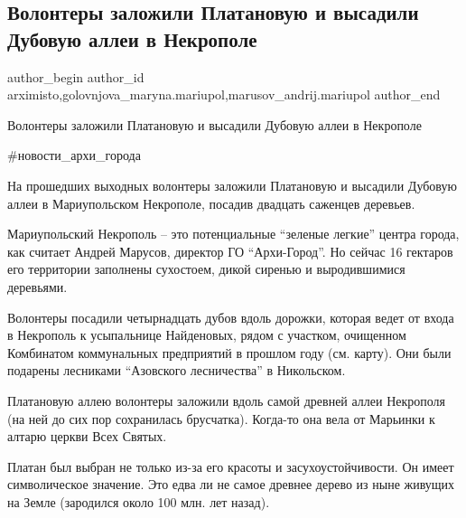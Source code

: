  
 
 
 
 

\subsection{Волонтеры заложили Платановую и высадили Дубовую аллеи в Некрополе}
\label{sec:26_04_2021.fb.arximisto.1.volontery_allei_platanovaja_dubovaja_nekropol}
 
\ifcmt
 author_begin
   author_id arximisto,golovnjova_maryna.mariupol,marusov_andrij.mariupol
 author_end
\fi

Волонтеры заложили Платановую и высадили Дубовую аллеи в Некрополе

\#новости\_архи\_города

На прошедших выходных волонтеры заложили Платановую и высадили Дубовую аллеи в
Мариупольском Некрополе, посадив двадцать саженцев деревьев.

Мариупольский Некрополь – это потенциальные \enquote{зеленые легкие} центра
города, как считает Андрей Марусов, директор ГО \enquote{Архи-Город}. Но сейчас
16 гектаров его территории заполнены сухостоем, дикой сиренью и выродившимися
деревьями. 

Волонтеры посадили четырнадцать дубов вдоль дорожки, которая ведет от входа в
Некрополь к усыпальнице Найденовых, рядом с участком, очищенном Комбинатом
коммунальных предприятий в прошлом году (см. карту). Они были подарены
лесниками \enquote{Азовского лесничества} в Никольском.

Платановую аллею волонтеры заложили вдоль самой древней аллеи Некрополя (на ней
до сих пор сохранилась брусчатка). Когда-то она вела от Марьинки к алтарю
церкви Всех Святых. 

Платан был выбран не только из-за его красоты и засухоустойчивости. Он имеет
символическое значение. Это едва ли не самое древнее дерево из ныне живущих на
Земле (зародился около 100 млн. лет назад).

